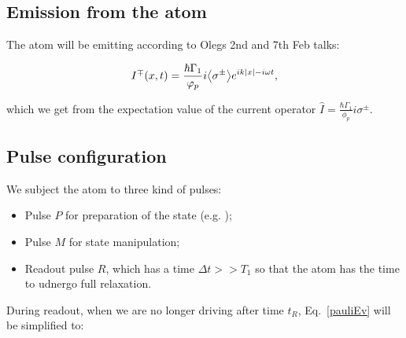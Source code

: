   \begin{figure}[h]
  \end{figure}

 \subsection{Emission from the atom}
 The atom will be emitting according to Olegs 2nd and 7th Feb talks:
  
  \[
    I^{\mp}(x,t)  =  \frac{\hbar\Gamma_{1}}{\varphi_p}i{\left\langle \sigma^{\pm} \right\rangle}e^{ik\left|x\right|-i\omega
      t},
  \]
  
  \noindent   which  we   get   from   the  expectation   value   of   the  current   operator
  $ \hat{I} = \frac{\hbar\Gamma_1}{\phi_p}i\sigma^{\pm} $.
  

 \subsection{Pulse configuration}
 We subject the atom to three kind of pulses:
 \begin{itemize}
 \item Pulse $ P $ for preparation of the state (e.g. \piulse);
 \item Pulse $ M $ for state manipulation;
 \item Readout pulse $ R $, which has a time $ \Delta t >> T_1 $ so that the atom has the time
   to udnergo full relaxation.
 \end{itemize}

 During readout, when we are no longer driving after time $ t_R $, Eq.~\eqref{pauliEv} will be
 simplified to:
   
